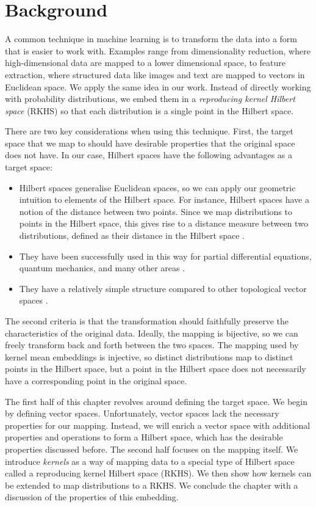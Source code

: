 \chapter{Background}
A common technique in machine learning is to transform the data into a form that is easier to work with. Examples range from dimensionality reduction, where high-dimensional data are mapped to a lower dimensional space, to feature extraction, where structured data like images and text are mapped to vectors in Euclidean space. We apply the same idea in our work. Instead of directly working with probability distributions, we embed them in a \emph{reproducing kernel Hilbert space} (RKHS) so that each distribution is a single point in the Hilbert space.

There are two key considerations when using this technique. First, the target space that we map to should have desirable properties that the original space does not have. In our case, Hilbert spaces have the following advantages as a target space:
%
\begin{itemize}
  \item Hilbert spaces generalise Euclidean spaces, so we can apply our geometric intuition to elements of the Hilbert space. For instance, Hilbert spaces have a notion of the distance between two points. Since we map distributions to points in the Hilbert space, this gives rise to a distance measure between two distributions, defined as their distance in the Hilbert space \needcite.
  \item They have been successfully used in this way for partial differential equations, quantum mechanics, and many other areas \needcite.
  \item They have a relatively simple structure compared to other topological vector spaces \needcite.
\end{itemize}
%
The second criteria is that the transformation should faithfully preserve the characteristics of the original data. Ideally, the mapping is bijective, so we can freely transform back and forth between the two spaces. The mapping used by kernel mean embeddings is injective, so distinct distributions map to distinct points in the Hilbert space, but a point in the Hilbert space does not necessarily have a corresponding point in the original space.

The first half of this chapter revolves around defining the target space. We begin by defining vector spaces. Unfortunately, vector spaces lack the necessary properties for our mapping. Instead, we will enrich a vector space with additional properties and operations to form a Hilbert space, which has the desirable properties discussed before. The second half focuses on the mapping itself. We introduce \emph{kernels} as a way of mapping data to a special type of Hilbert space called a reproducing kernel Hilbert space (RKHS). We then show how kernels can be extended to map distributions to a RKHS. We conclude the chapter with a discussion of the properties of this embedding.

